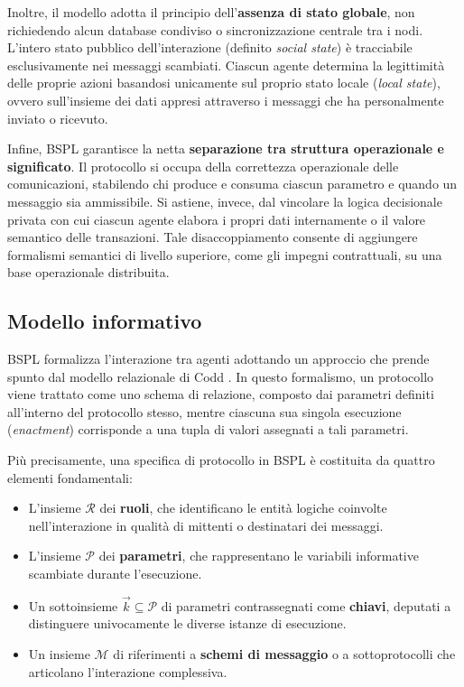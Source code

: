 Inoltre, il modello adotta il principio dell'\textbf{assenza di stato globale}, 
non richiedendo alcun database condiviso o sincronizzazione centrale 
tra i nodi. L'intero stato pubblico dell'interazione (definito \emph{social state}) è 
tracciabile esclusivamente nei messaggi scambiati. Ciascun agente determina la 
legittimità delle proprie azioni basandosi unicamente sul proprio stato locale (\emph{local 
state}), ovvero sull'insieme dei dati appresi attraverso i messaggi che ha personalmente 
inviato o ricevuto.

Infine, BSPL garantisce la netta \textbf{separazione tra struttura operazionale e significato}.
Il protocollo si occupa della correttezza operazionale delle comunicazioni, 
stabilendo chi produce e consuma ciascun parametro e quando un messaggio sia ammissibile.
Si astiene, invece, dal vincolare la logica decisionale privata con cui ciascun agente elabora
i propri dati internamente o il valore semantico delle transazioni. 
Tale disaccoppiamento consente di aggiungere formalismi semantici di livello superiore, 
come gli impegni contrattuali, su una base operazionale distribuita.

\subsection{Modello informativo}\label{bspl:modello}

BSPL formalizza l'interazione tra agenti adottando un approccio che prende spunto 
dal modello relazionale di Codd \autocite{singh2011bspl}. In questo formalismo, 
un protocollo viene trattato come uno schema di relazione, composto dai parametri definiti all'interno
del protocollo stesso, mentre ciascuna sua singola esecuzione (\emph{enactment}) corrisponde a una tupla di 
valori assegnati a tali parametri.

Più precisamente, una specifica di protocollo in BSPL è costituita da quattro elementi fondamentali:
\begin{itemize}
    \item L'insieme $\mathcal{R}$ dei \textbf{ruoli}, che identificano le entità logiche 
    coinvolte nell'interazione in qualità di mittenti o destinatari dei messaggi.
    \item L'insieme $\mathcal{P}$ dei \textbf{parametri}, che rappresentano le variabili 
    informative scambiate durante l'esecuzione.
    \item Un sottoinsieme $\vec{k} \subseteq \mathcal{P}$ di parametri contrassegnati come \textbf{chiavi}, deputati a distinguere univocamente le diverse 
    istanze di esecuzione.
    \item Un insieme $\mathcal{M}$ di riferimenti a \textbf{schemi di messaggio} o a 
    sottoprotocolli che articolano l'interazione complessiva.
\end{itemize}

